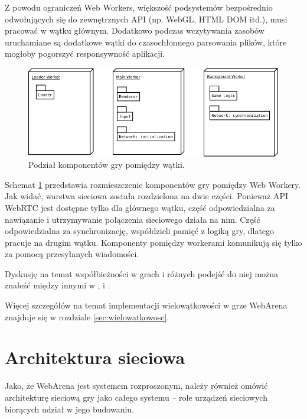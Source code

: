 Z powodu ograniczeń Web Workers, większość podsystemów bezpośrednio odwołujących
się do zewnętrznych API (np. WebGL, HTML DOM itd.), musi pracować w wątku głównym.
Dodatkowo podczas wczytywania zasobów uruchamiane są dodatkowe wątki do
czasochłonnego parsowania plików, które mogłoby pogorszyć responsywność
aplikacji.

\begin{figure}[h]
  \centering
  \includegraphics[scale=0.4]{zasoby/rozdzial3/workers}
  \caption{Podział komponentów gry pomiędzy wątki.}
  \label{fig:workers}
\end{figure}

Schemat \ref{fig:workers} przedstawia rozmieszczenie komponentów gry pomiędzy Web
Workery. Jak widać, warstwa sieciowa została rozdzielona na dwie części. Ponieważ
API WebRTC jest dostępne tylko dla głównego wątku, część odpowiedzialna za
nawiązanie i utrzymywanie połączenia sieciowego działa na nim. Część odpowiedzialna
za synchronizację, współdzieli pamięć z logiką gry, dlatego pracuje na drugim
wątku. Komponenty pomiędzy workerami komunikują się tylko za pomocą przesyłanych
wiadomości.

Dyskusję na temat współbieżności w grach i różnych podejść do niej można znaleźć
między innymi w \cite{game-engine}, \cite{multithreaded-game-engine}
i \cite{parallel-game-engine}.

Więcej szczegółów na temat implementacji wielowątkowości w grze WebArena znajduje
się w rozdziale \ref{sec:wielowatkowosc}.

\section{Architektura sieciowa}
\label{ssec:architekturaSieciowa}

Jako, że WebArena jest systemem rozproszonym, należy również omówić architekturę
sieciową gry jako całego systemu -- role urządzeń sieciowych biorących udział w
jego budowaniu.

